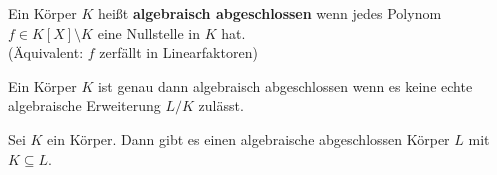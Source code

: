 	\begin{definition}
		Ein Körper $K$ heißt \textbf{algebraisch abgeschlossen} wenn jedes Polynom $f\in K[X]\setminus K$ eine Nullstelle in $K$ hat.\\
		(Äquivalent: $f$ zerfällt in Linearfaktoren)
	\end{definition}

	\begin{satz}
		Ein Körper $K$ ist genau dann algebraisch abgeschlossen wenn es keine echte algebraische Erweiterung $L/K$ zulässt.
	\end{satz}

	\begin{theorem}
		Sei $K$ ein Körper. Dann gibt es einen algebraische abgeschlossen Körper $L$ mit $K\subseteq L$.
	\end{theorem}
